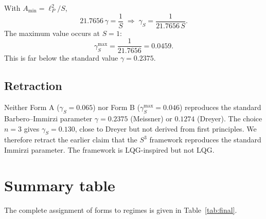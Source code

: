 \documentclass[12pt,oneside,openany]{book}
\begin{document}
With $A_{\text{min}}=\ell_{P}^{2}/S$,
\begin{equation}
21.7656\,\gamma=\frac{1}{S}
\;\Longrightarrow\;
\gamma_{S}=\frac{1}{21.7656\,S}.
\label{eq:gamma-B}
\end{equation}
The maximum value occurs at $S=1$:
\begin{equation}
\gamma_{S}^{\max}=\frac{1}{21.7656}=0.0459.
\label{eq:gamma-Bmax}
\end{equation}
This is far below the standard value $\gamma=0.2375$.

\subsection{Retraction}

Neither Form A ($\gamma_{S}=0.065$) nor Form B
($\gamma_{S}^{\max}=0.046$) reproduces the standard
Barbero--Immirzi parameter $\gamma=0.2375$ (Meissner) or
$0.1274$ (Dreyer). The choice $n=3$ gives $\gamma_{S}=0.130$,
close to Dreyer but not derived from first principles. We
therefore retract the earlier claim that the $S^{3}$ framework
reproduces the standard Immirzi parameter. The framework is
LQG-inspired but not LQG.

\section{Summary table}

The complete assignment of forms to regimes is given in
Table~\ref{tab:final}.
\end{document}
